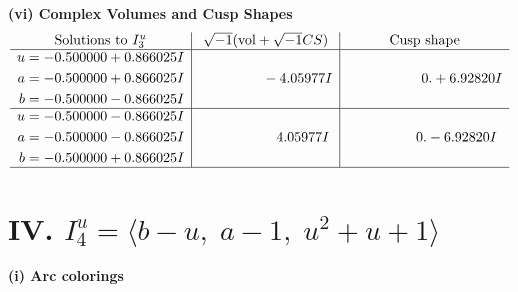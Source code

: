 \documentclass[1p]{elsarticle_modified}
\theoremstyle{definition}
\newcommand{\I}{\sqrt{-1}}
\begin{document}
\newpage\flushleft \textbf{(vi) Complex Volumes and Cusp Shapes}
$$\begin{array}{c|c|c}  
\text{Solutions to }I^u_{3}& \I (\text{vol} + \sqrt{-1}CS) & \text{Cusp shape}\\
 \hline 
\begin{aligned}
u &= -0.500000 + 0.866025 I \\
a &= -0.500000 + 0.866025 I \\
b &= -0.500000 - 0.866025 I\end{aligned}
 & \phantom{-0.000000 } -4.05977 I & \phantom{-0.000000 -}0. + 6.92820 I \\ \hline\begin{aligned}
u &= -0.500000 - 0.866025 I \\
a &= -0.500000 - 0.866025 I \\
b &= -0.500000 + 0.866025 I\end{aligned}
 & \phantom{-0.000000 -}4.05977 I & \phantom{-0.000000 } 0. - 6.92820 I\\
 \hline 
 \end{array}$$\newpage\newpage\renewcommand{\arraystretch}{1}
\centering \section*{IV. $I^u_{4}= \langle b- u,\;a-1,\;u^2+u+1 \rangle$}
\flushleft \textbf{(i) Arc colorings}\\
\end{document}
